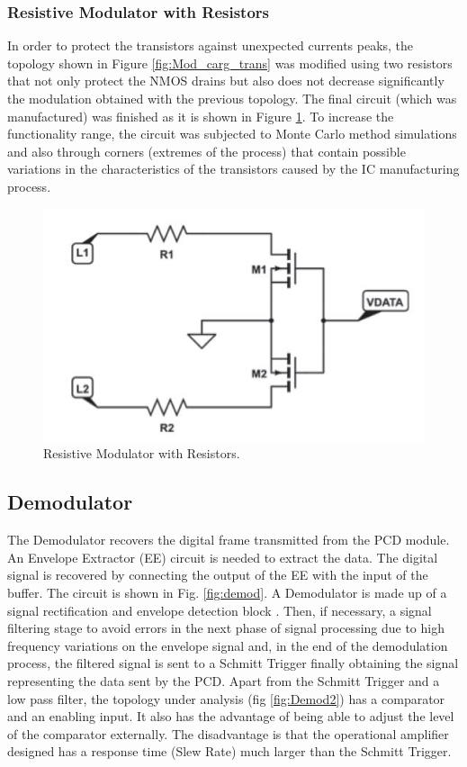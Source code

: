 \documentclass[a4paper, 10pt, conference]{ieeeconf}      %
\begin{document}
\subsubsection{Resistive Modulator with Resistors}
In order to protect the transistors against unexpected currents peaks, the topology shown in Figure  \ref{fig:Mod_carg_trans} was modified using two resistors that not only protect the NMOS drains but also does not decrease significantly the modulation obtained with the previous topology. The final circuit (which was manufactured) was finished as it is shown in Figure \ref{fig:Mod_carg_res}. To increase the functionality range, the circuit was subjected to Monte Carlo method simulations and also through corners (extremes of the process) that contain possible variations in the characteristics of the transistors caused by the IC manufacturing process.
\begin{figure}[H]
\centering
\includegraphics[scale=0.5]{Images/ImagenesTesina/Antecedentes/Modulacion_Carga_Res.JPG}
\caption{Resistive Modulator with Resistors.}
\label{fig:Mod_carg_res}
\end{figure}

\subsection{Demodulator}

The Demodulator recovers the digital frame transmitted from the PCD module. An Envelope Extractor (EE) circuit \cite{c4} is needed to extract the data. The digital signal is recovered by connecting the output of the EE with the input of the buffer. The circuit is shown in Fig. \ref{fig:demod}. A Demodulator is made up of a signal rectification and envelope detection block . Then, if necessary, a signal filtering stage to avoid errors in the next phase of signal processing due to high frequency variations on the envelope signal and, in the end of the demodulation process, the filtered signal is sent to a Schmitt Trigger  \cite{c6} finally obtaining the signal representing the data sent by the PCD. 
Apart from the Schmitt Trigger and a low pass filter, the topology under analysis (fig  \ref{fig:Demod2}) has a comparator and an enabling input. It also has the advantage of being able to adjust the level of the comparator externally. The disadvantage is that the operational amplifier designed has a response time (Slew Rate) much larger than the Schmitt Trigger.
\end{document}
